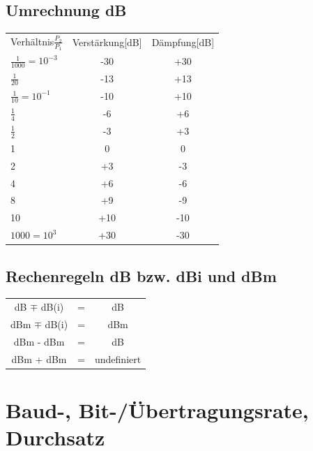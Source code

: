 \documentclass[fs, footer]{latex4ei}
\begin{document}
\begin{multicols*}{4}
{	\subsection{Umrechnung dB}
\begin{tabular}[h]{l|c|c}
	Verhältnis$\frac{P_2}{P_1}$ & Verstärkung[dB] & Dämpfung[dB] \\
	$\frac{1}{1000} = 10^{-3}$ & -30 & +30 \\
	$\frac{1}{20}$ & -13 & +13 \\
	$\frac{1}{10} = 10^{-1} $ & -10 & +10 \\
	$\frac{1}{4}$ & -6 & +6 \\
	$\frac{1}{2}$ & -3 & +3 \\
	1 & 0 & 0 \\
	2 & +3 & -3 \\
	4 & +6 & -6 \\
	8 & +9 & -9 \\
	10 & +10 & -10\\
	$1000 = 10^3$ & +30 & -30  
\end{tabular}

	\subsection{Rechenregeln dB bzw. dBi und dBm}
\begin{tabular}[h]{c c c}
	dB $\mp$ dB(i) 	& = & dB  \\
	dBm $\mp$ dB(i) 	& = & dBm  \\
	dBm - dBm 		& = & dB  \\
	dBm + dBm 		& = & undefiniert
\end{tabular}
}


\section{Baud-, Bit-/Übertragungsrate, Durchsatz}
\end{multicols*}
\end{document}
